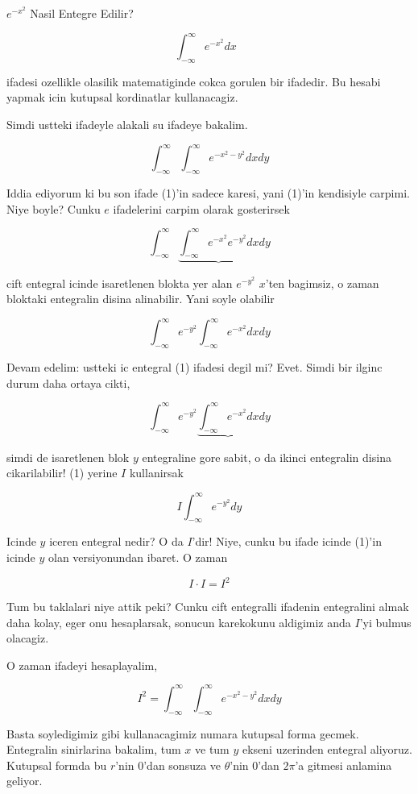 \documentclass[12pt,fleqn]{article}
\begin{document}
$e^{-x^2}$ Nasil Entegre Edilir? 

\[ \int_{-\infty}^{\infty} e^{-x^2} dx \ \ \ \label{1} \]

ifadesi ozellikle olasilik matematiginde cokca gorulen bir ifadedir. Bu
hesabi yapmak icin kutupsal kordinatlar kullanacagiz. 

Simdi ustteki ifadeyle alakali su ifadeye bakalim. 

\[ \int_{-\infty}^{\infty} \int_{-\infty}^{\infty} e^{-x^2-y^2} dx dy \]

Iddia ediyorum ki bu son ifade (1)'in sadece karesi, yani (1)'in kendisiyle
carpimi. Niye boyle? Cunku $e$ ifadelerini carpim olarak gosterirsek

\[ \int_{-\infty}^{\infty} 
\underbrace{\int_{-\infty}^{\infty} e^{-x^2} e^{-y^2} dx}
dy \]

cift entegral icinde isaretlenen blokta yer alan $e^{-y^2}$ $x$'ten
bagimsiz, o zaman bloktaki entegralin disina alinabilir. Yani soyle olabilir

\[ \int_{-\infty}^{\infty} 
e^{-y^2} \int_{-\infty}^{\infty} e^{-x^2}  dx
dy \]

Devam edelim: ustteki ic entegral (1) ifadesi degil mi? Evet. Simdi bir
ilginc durum daha ortaya cikti, 

\[ \int_{-\infty}^{\infty}  e^{-y^2} 
\underbrace{\int_{-\infty}^{\infty} e^{-x^2}  dx}
dy \]

simdi de isaretlenen blok $y$ entegraline gore sabit, o da ikinci
entegralin disina cikarilabilir! (1) yerine $I$ kullanirsak 

\[ I \int_{-\infty}^{\infty}  e^{-y^2} dy \]

Icinde $y$ iceren entegral nedir? O da $I$'dir! Niye, cunku bu ifade icinde
(1)'in icinde $y$ olan versiyonundan ibaret. O zaman 

\[ I \cdot I = I^2 \]

Tum bu taklalari niye attik peki? Cunku cift entegralli ifadenin
entegralini almak daha kolay, eger onu hesaplarsak, sonucun karekokunu
aldigimiz anda $I$'yi bulmus olacagiz. 

O zaman ifadeyi hesaplayalim, 

\[ I^2 = \int_{-\infty}^{\infty} \int_{-\infty}^{\infty} e^{-x^2-y^2} dx dy \]

Basta soyledigimiz gibi kullanacagimiz numara kutupsal forma
gecmek. Entegralin sinirlarina bakalim, tum $x$ ve tum $y$ ekseni uzerinden
entegral aliyoruz. Kutupsal formda bu $r$'nin 0'dan sonsuza ve $\theta$'nin
0'dan $2\pi$'a gitmesi anlamina geliyor. 
\end{document}
